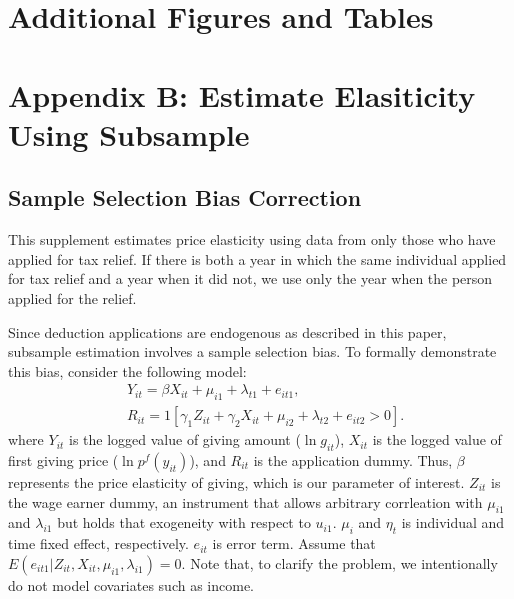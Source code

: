 \documentclass[
  11pt,
  a4paper,
]{article}
\begin{document}
\newpage

\hypertarget{appendix-appendix}{%
\appendix}


\hypertarget{additional-figures-and-tables}{%
\section{Additional Figures and Tables}\label{additional-figures-and-tables}}

\clearpage

\hypertarget{appendix-b-estimate-elasiticity-using-subsample}{%
\section{Appendix B: Estimate Elasiticity Using Subsample}\label{appendix-b-estimate-elasiticity-using-subsample}}

\hypertarget{sample-selection-bias-correction}{%
\subsection{Sample Selection Bias Correction}\label{sample-selection-bias-correction}}

This supplement estimates price elasticity
using data from only those who have applied for tax relief.
If there is both
a year in which the same individual applied for tax relief
and a year when it did not,
we use only the year when the person applied for the relief.

Since deduction applications are endogenous as described in this paper,
subsample estimation involves a sample selection bias.
To formally demonstrate this bias, consider the following model:
\begin{align}
  &Y_{it} = \beta  X_{it} + \mu_{i1} + \lambda_{t1} + e_{it1}, \\
  &R_{it} = 1[\gamma_1 Z_{it} + \gamma_2 X_{it} + \mu_{i2} + \lambda_{t2} + e_{it2} > 0].
\end{align}
where \(Y_{it}\) is the logged value of giving amount (\(\ln g_{it}\)),
\(X_{it}\) is the logged value of first giving price (\(\ln p^f(y_{it})\)),
and \(R_{it}\) is the application dummy.
Thus, \(\beta\) represents the price elasticity of giving,
which is our parameter of interest.
\(Z_{it}\) is the wage earner dummy,
an instrument that allows arbitrary corrleation
with \(\mu_{i1}\) and \(\lambda_{i1}\) but
holds that exogeneity with respect to \(u_{i1}\).
\(\mu_i\) and \(\eta_t\) is individual and time fixed effect, respectively.
\(e_{it}\) is error term.
Assume that \(E(e_{it1} |Z_{it}, X_{it}, \mu_{i1}, \lambda_{i1}) = 0\).
Note that, to clarify the problem,
we intentionally do not model covariates such as income.
\end{document}
